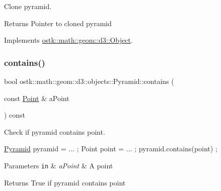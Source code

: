 Clone pyramid. 

\begin{DoxyReturn}{Returns}
Pointer to cloned pyramid 
\end{DoxyReturn}


Implements \hyperlink{classostk_1_1math_1_1geom_1_1d3_1_1_object_a676013f9555f6492687f9809b2db887b}{ostk\+::math\+::geom\+::d3\+::\+Object}.

\mbox{\label{classostk_1_1math_1_1geom_1_1d3_1_1objects_1_1_pyramid_a7f476c37cc3f014bdc24e7fa4f2da743}} 
\subsubsection{\texorpdfstring{contains()}{contains()}\hspace{0.1cm}{\footnotesize\ttfamily [1/2]}}
{\footnotesize\ttfamily bool ostk\+::math\+::geom\+::d3\+::objects\+::\+Pyramid\+::contains (\begin{DoxyParamCaption}\item[{const \hyperlink{classostk_1_1math_1_1geom_1_1d3_1_1objects_1_1_point}{Point} \&}]{a\+Point }\end{DoxyParamCaption}) const}



Check if pyramid contains point. 


\begin{DoxyCode}
\hyperlink{classostk_1_1math_1_1geom_1_1d3_1_1objects_1_1_pyramid_a5560d123994714b36d4737b358dadcea}{Pyramid} pyramid = ... ;
Point point = ... ;
pyramid.contains(point) ;
\end{DoxyCode}



\begin{DoxyParams}[1]{Parameters}
\mbox{\tt in}  & {\em a\+Point} & A point \\
\hline
\end{DoxyParams}
\begin{DoxyReturn}{Returns}
True if pyramid contains point 
\end{DoxyReturn}
\mbox{\label{classostk_1_1math_1_1geom_1_1d3_1_1objects_1_1_pyramid_a761592bada278f4a80f910e3e234fde8}} 
